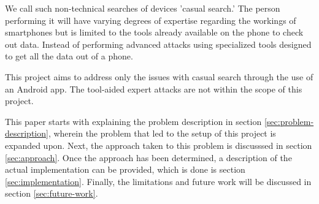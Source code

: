 \documentclass[twocolumn,english,compsoc,journal]{IEEEtran}
\begin{document}
We call such non-technical searches of devices 'casual search.' The
person performing it will have varying degrees of expertise regarding
the workings of smartphones but is limited to the tools already available
on the phone to check out data. Instead of performing advanced attacks
using specialized tools designed to get all the data out of a phone.

This project aims to address only the issues with casual search through
the use of an Android app. The tool-aided expert attacks are not within the
scope of this project.

This paper starts with explaining the problem description in section \ref{sec:problem-description}, wherein the problem that led to the setup of this project is expanded upon.
Next, the approach taken to this problem is discusssed in section \ref{sec:approach}.
Once the approach has been determined, a description of the actual implementation can be provided, which is done is section \ref{sec:implementation}.
Finally, the limitations and future work will be discussed in section \ref{sec:future-work}.











\end{document}
